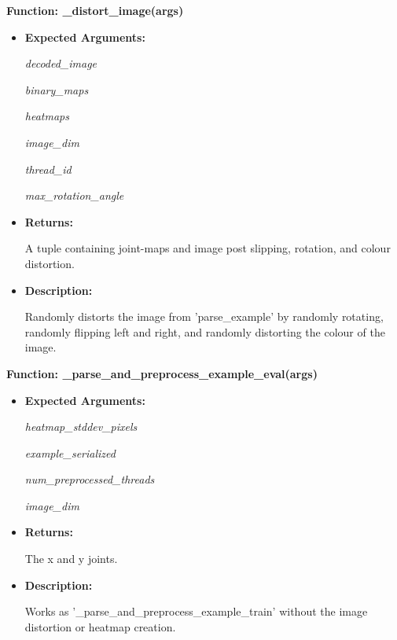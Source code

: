 \documentclass{scrreprt}
\begin{document}
\textbf{Function: \_distort\_image(args)}
\begin{itemize}
    \item \textbf{Expected Arguments:}

            \quad\textit{decoded\_image}

            \quad\textit{binary\_maps}

            \quad\textit{heatmaps}

            \quad\textit{image\_dim}

            \quad\textit{thread\_id}

            \quad\textit{max\_rotation\_angle}

    \item \textbf{Returns:}

            A tuple containing joint-maps and image post slipping, rotation, and colour distortion.

    \item \textbf{Description:}

            Randomly distorts the image from 'parse\_example' by randomly rotating, randomly flipping left and right, and randomly distorting the colour of the image.

\end{itemize}

\textbf{Function: \_parse\_and\_preprocess\_example\_eval(args)}
\begin{itemize}
    \item \textbf{Expected Arguments:}

            \quad\textit{heatmap\_stddev\_pixels}

            \quad\textit{example\_serialized}

            \quad\textit{num\_preprocessed\_threads}

            \quad\textit{image\_dim}

    \item \textbf{Returns:}

            The x and y joints.

    \item \textbf{Description:}

            Works as '\_parse\_and\_preprocess\_example\_train' without the image distortion or heatmap creation.

\end{itemize}
\end{document}

